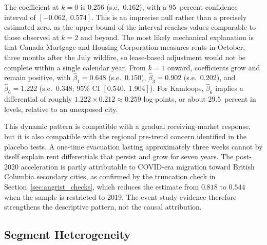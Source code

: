\documentclass[12pt]{article}
\begin{document}
The coefficient at $k=0$ is $0.256$ (s.e.\ $0.162$), with a 95~percent
confidence interval of $[-0.062,\;0.574]$. This is an imprecise null rather than a precisely estimated zero, as the
upper bound of the interval reaches values comparable to those observed
at $k=2$ and beyond. The most likely mechanical
explanation is that Canada Mortgage and Housing Corporation measures rents in
October, three months after the July wildfire, so lease-based adjustment
would not be complete within a single calendar year. From $k=1$ onward,
coefficients grow and remain positive, with $\hat{\beta}_1=0.648$ (s.e.\ $0.150$),
$\hat{\beta}_3=0.902$ (s.e.\ $0.202$), and $\hat{\beta}_6=1.222$
(s.e.\ $0.348$; 95\% CI $[0.540,\;1.904]$). For Kamloops,
$\hat{\beta}_6$ implies a differential of roughly
$1.222\times0.212\approx0.259$ log-points, or about $29.5$~percent in levels,
relative to an unexposed city.

This dynamic pattern is compatible with a gradual receiving-market response,
but it is also compatible with the regional pre-trend concern identified in the
placebo tests. A one-time evacuation lasting approximately three weeks cannot
by itself explain rent differentials that persist and grow for seven years.
The post-2020 acceleration is partly attributable to COVID-era migration toward
British Columbia secondary cities, as confirmed by the truncation check in
Section~\ref{sec:angrist_checks}, which reduces the estimate from $0.818$
to $0.544$ when the sample is restricted to 2019. The event-study evidence
therefore strengthens the descriptive pattern, not the causal attribution.

\subsection{Segment Heterogeneity}
\end{document}
